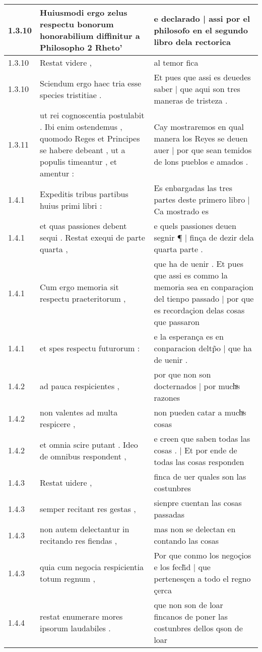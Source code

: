 \begin{tabular}{|p{1cm}|p{6.5cm}|p{6.5cm}|}
1.3.10 & Huiusmodi ergo zelus respectu bonorum honorabilium diffinitur a Philosopho 2 Rheto’ & e declarado | assi por el philosofo en el segundo libro dela rectorica \\\hline
1.3.10 & Restat videre , & al temor fica \\\hline
1.3.10 & Sciendum ergo haec tria esse species tristitiae . & Et pues que assi es deuedes saber | que aqui son tres maneras de tristeza . \\\hline
1.3.11 & ut rei cognoscentia postulabit . Ibi enim ostendemus , quomodo Reges et Principes se habere debeant , ut a populis timeantur , et amentur : & Cay mostraremos en qual manera los Reyes se deuen auer | por que sean temidos de lons pueblos e amados . \\\hline
1.4.1 & Expeditis tribus partibus huius primi libri : & Es enbargadas las tres partes deste primero libro | Ca mostrado es \\\hline
1.4.1 & et quas passiones debent sequi . Restat exequi de parte quarta , & e quels passiones deuen segnir ¶ | finça de dezir dela quarta parte . \\\hline
1.4.1 & Cum ergo memoria sit respectu praeteritorum , & que ha de uenir . Et pues que assi es commo la memoria sea en conparaçion del tienpo passado | por que es recordaçion delas cosas que passaron \\\hline
1.4.1 & et spes respectu futurorum : & e la esperança es en conparacion deltp̃o | que ha de uenir . \\\hline
1.4.2 & ad pauca respicientes , & por que non son docternados | por muchͣs razones \\\hline
1.4.2 & non valentes ad multa respicere , & non pueden catar a muchͣs cosas \\\hline
1.4.2 & et omnia scire putant . Ideo de omnibus respondent , & e creen que saben todas las cosas . | Et por ende de todas las cosas responden \\\hline
1.4.3 & Restat uidere , & finca de uer quales son las costunbres \\\hline
1.4.3 & semper recitant res gestas , & sienpre cuentan las cosas passadas \\\hline
1.4.3 & non autem delectantur in recitando res fiendas , & mas non se delectan en contando las cosas \\\hline
1.4.3 & quia cum negocia respicientia totum regnum , & Por que conmo los negoçios e los fech̃d | que pertenesçen a todo el regno çerca \\\hline
1.4.4 & restat enumerare mores ipsorum laudabiles . & que non son de loar fincanos de poner las costunbres dellos qson de loar \\\hline

\end{tabular}
